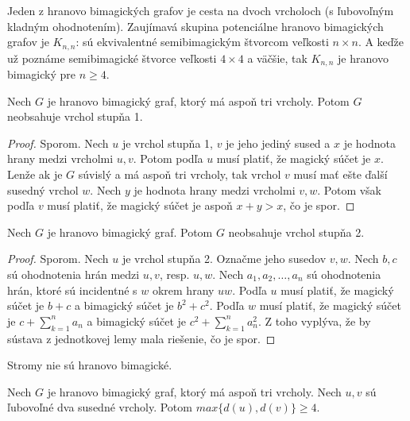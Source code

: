 Jeden z hranovo bimagických grafov je cesta na dvoch vrcholoch (s ľubovoľným kladným ohodnotením). Zaujímavá skupina potenciálne hranovo bimagických grafov je $K _{n,n}$: sú ekvivalentné semibimagickým štvorcom veľkosti $n \times n$. A keďže už poznáme semibimagické štvorce veľkosti $4 \times 4$ a väčšie, tak $K _{n,n}$ je hranovo bimagický pre $n \geq 4$.  \\

\begin{theorem}
\label{hbgdegree1}
Nech $G$ je hranovo bimagický graf, ktorý má aspoň tri vrcholy. Potom $G$ neobsahuje vrchol stupňa 1.
\end{theorem}

\begin{proof} Sporom. Nech $u$ je vrchol stupňa 1, $v$ je jeho jediný sused a $x$ je hodnota hrany medzi vrcholmi $u,v$. Potom podľa $u$ musí platiť, že magický súčet je $x$. Lenže ak je $G$ súvislý a má aspoň tri vrcholy, tak vrchol $v$ musí mať ešte ďalší susedný vrchol $w$. Nech $y$ je hodnota hrany medzi vrcholmi $v,w$. Potom však podľa $v$ musí platiť, že magický súčet je aspoň $x + y > x$, čo je spor.
\end{proof} 

\begin{theorem} Nech $G$ je hranovo bimagický graf. Potom $G$ neobsahuje vrchol stupňa 2.
\end{theorem}

\begin{proof} Sporom. Nech $u$ je vrchol stupňa 2. Označme jeho susedov $v,w$. Nech $b,c$ sú ohodnotenia hrán medzi $u,v$, resp. $u,w$. Nech $a_1, a_2, \dots , a_n$ sú ohodnotenia hrán, ktoré sú incidentné s $w$ okrem hrany $uw$. Podľa $u$ musí platiť, že magický súčet je $b+c$ a bimagický súčet je $b^2 + c^2$. Podľa $w$ musí platiť, že magický súčet je $c + \sum_{k=1}^{n} a_n$ a bimagický súčet je $c^2 + \sum_{k=1}^{n} a^2_n$. Z toho vyplýva, že by sústava z jednotkovej lemy mala riešenie, čo je spor.
\end{proof} 

\begin{consequence}
\label{hbgtree} 
Stromy nie sú hranovo bimagické.
\end{consequence}

\begin{theorem} Nech $G$ je hranovo bimagický graf, ktorý má aspoň tri vrcholy. Nech $u,v$ sú ľubovoľné dva susedné vrcholy. Potom $max \{d(u), d(v)\} \geq 4$.
\end{theorem}

